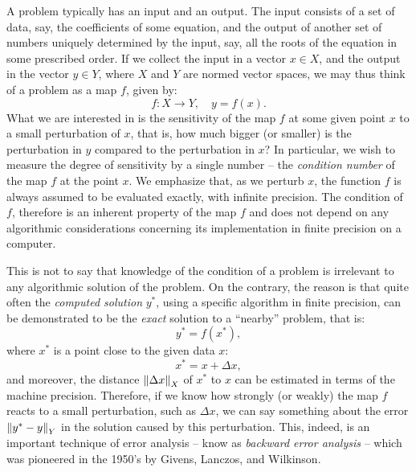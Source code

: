 A problem typically has an input and an output. The input consists of a set of data, say, the coefficients of some equation, and the output of another set of numbers uniquely determined by the input, say, all the roots of the equation in some prescribed order. If we collect the input in a vector $x\in X$, and the output in the vector $y\in Y$, where $X$ and $Y$ are normed vector spaces, we may thus think of a problem as a map $f$, given by:
\begin{equation}
f:X\to Y,\quad y = f(x).
\end{equation}
What we are interested in is the sensitivity of the map $f$ at some given point $x$ to a small perturbation of $x$, that is, how much bigger (or smaller) is the perturbation in $y$ compared to the perturbation in $x$? In particular, we wish to measure the degree of sensitivity by a single number -- the {\em condition number} of the map $f$ at the point $x$. We emphasize that, as we perturb $x$, the function $f$ is always assumed to be evaluated exactly, with infinite precision. The condition of $f$, therefore is an inherent property of the map $f$ and does not depend on any algorithmic considerations concerning its implementation in finite precision on a computer.

This is not to say that knowledge of the condition of a problem is irrelevant to any algorithmic solution of the problem. On the contrary, the reason is that quite often the {\em computed solution} $y^*$, using a specific algorithm in finite precision, can be demonstrated to be the {\em exact} solution to a ``nearby'' problem, that is:
\begin{equation}
y^* = f(x^*),
\end{equation}
where $x^*$ is a point close to the given data $x$:
\begin{equation}
x^* = x+\Delta x,
\end{equation}
and moreover, the distance $\left\|{\Delta x}\right\|_X$ of $x^*$ to $x$ can be estimated in terms of the machine precision. Therefore, if we know how strongly (or weakly) the map $f$ reacts to a small perturbation, such as $\Delta x$, we can say something about the error $\left\|{y^*-y}\right\|_Y$ in the solution caused by this perturbation. This, indeed, is an important technique of error analysis -- know as {\em backward error analysis} -- which was pioneered in the 1950's by Givens, Lanczos, and Wilkinson.


